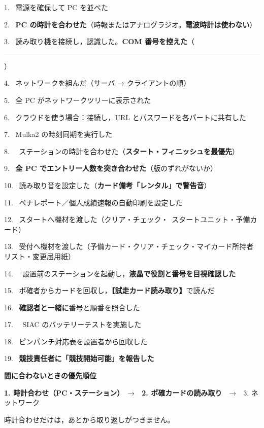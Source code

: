 \begin{cklist}
\item[1.] \ck\ 電源を確保して PC を並べた
\item[2.] \ck\ \textbf{PC の時計を合わせた}（時報またはアナログラジオ。\textbf{電波時計は使わない}）
\item[3.] \ck\ 読み取り機を接続し，認識した。\textbf{COM 番号を控えた}（\rule{16mm}{0.4pt}）
\item[4.] \ck\ ネットワークを組んだ（サーバ → クライアントの順）
\item[5.] \ck\ 全 PC がネットワークツリーに表示された
\item[6.] \ck\ クラウドを使う場合：接続し，URL とパスワードを各パートに共有した
\item[7.] \ck\ Mulka2 の時刻同期を実行した
\item[8.] \ck\ \tSI\ ステーションの時計を合わせた（\textbf{スタート・フィニッシュを最優先}）
\item[9.] \ck\ \textbf{全 PC でエントリー人数を突き合わせた}（版のずれがないか）
\item[10.] \ck\ 読み取り音を設定した（\textbf{カード備考「レンタル」で警告音}）
\item[11.] \ck\ ペナレポート／個人成績速報の自動印刷を設定した
\item[12.] \ck\ スタートへ機材を渡した（クリア・チェック・\tEMIT\ スタートユニット・予備カード）
\item[13.] \ck\ 受付へ機材を渡した（予備カード・クリア・チェック・マイカード所持者リスト・変更届用紙）
\item[14.] \ck\ \tSI\ 設置前のステーションを起動し，\textbf{液晶で役割と番号を目視確認した}
\item[15.] \ck\ ポ確者からカードを回収し，\textbf{【試走カード読み取り】}で読んだ
\item[16.] \ck\ \textbf{確認者と一緒に}番号と順番を照合した
\item[17.] \ck\ \tSIAC\ SIAC のバッテリーテストを実施した
\item[18.] \ck\ ピンパンチ対応表を設置者から回収した
\item[19.] \ck\ \textbf{競技責任者に「競技開始可能」を報告した}
\end{cklist}

\vspace{4mm}
\noindent\begin{tcolorbox}[colback=failbg,colframe=failfr,boxrule=0.6pt,arc=2pt]
{\sffamily\bfseries 間に合わないときの優先順位}\par\vspace{1mm}
\textbf{1. 時計合わせ（PC・ステーション）}　→　\textbf{2. ポ確カードの読み取り}　→　3. ネットワーク\par
\vspace{1mm}時計合わせだけは，あとから取り返しがつきません。
\end{tcolorbox}

